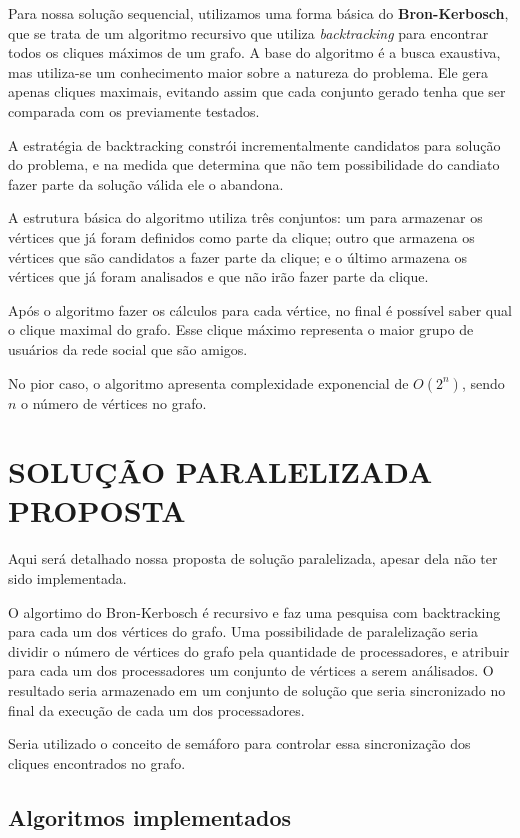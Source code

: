 \documentclass[12pt]{article}
\begin{document}
Para nossa solução sequencial, utilizamos uma forma básica do \textbf{Bron-Kerbosch}, que se trata de um algoritmo recursivo que utiliza \textit{backtracking} para encontrar todos os cliques máximos de um grafo. A base do algoritmo é a busca exaustiva, mas utiliza-se um conhecimento maior sobre a natureza do problema. Ele gera apenas cliques maximais, evitando assim que cada conjunto gerado tenha que ser comparada com os previamente testados. \cite{bron}

A estratégia de backtracking constrói incrementalmente candidatos para solução do problema, e na medida que determina que não tem possibilidade do candiato fazer parte da solução válida ele o abandona. \cite{wikiback}

A estrutura básica do algoritmo utiliza três conjuntos: um para armazenar os vértices que já foram definidos como parte da clique; outro que armazena os vértices que são candidatos a fazer parte da clique; e o último armazena os vértices que já foram analisados e que não irão fazer parte da clique.

Após o algoritmo fazer os cálculos para cada vértice, no final é possível saber qual o clique maximal do grafo. Esse clique máximo representa o maior grupo de usuários da rede social que são amigos.

No pior caso, o algoritmo apresenta complexidade exponencial de $O(2^n)$, sendo $n$ o número de vértices no grafo.

\section{SOLUÇÃO PARALELIZADA PROPOSTA}
\label{solucao_paralelizada_proposta}

Aqui será detalhado nossa proposta de solução paralelizada, apesar dela não ter sido implementada.

O algortimo do Bron-Kerbosch é recursivo e faz uma pesquisa com backtracking para cada um dos vértices do grafo. Uma possibilidade de paralelização seria dividir o número de vértices do grafo pela quantidade de processadores, e atribuir para cada um dos processadores um conjunto de vértices a serem análisados. O resultado seria armazenado em um conjunto de solução que seria sincronizado no final da execução de cada um dos processadores.

Seria utilizado o conceito de semáforo para controlar essa sincronização dos cliques encontrados no grafo.


\subsection{Algoritmos implementados}
\end{document}
